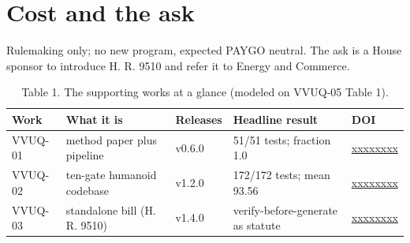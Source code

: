 \section{Cost and the ask}
\label{sec:e}

Rulemaking only; no new program, expected PAYGO neutral. The ask is a House sponsor to introduce H. R. 9510 and refer it to Energy and Commerce.

\begin{table}[H]
\centering
\footnotesize
\begin{tabularx}{\textwidth}{@{}L{1.55cm} Y L{1.4cm} Y L{1.55cm}@{}}
\toprule
\textbf{Work} & \textbf{What it is} & \textbf{Releases} & \textbf{Headline result} & \textbf{DOI}\\
\midrule
VVUQ-01 & method paper plus pipeline & v0.6.0 & 51/51 tests; fraction 1.0 & \href{https://doi.org/10.5281/zenodo.xxxxxxxx}{xxxxxxxx}\\
VVUQ-02 & ten-gate humanoid codebase & v1.2.0 & 172/172 tests; mean 93.56 & \href{https://doi.org/10.5281/zenodo.xxxxxxxx}{xxxxxxxx}\\
VVUQ-03 & standalone bill (H. R. 9510) & v1.4.0 & verify-before-generate as statute & \href{https://doi.org/10.5281/zenodo.xxxxxxxx}{xxxxxxxx}\\
\bottomrule
\end{tabularx}
\caption{Table 1. The supporting works at a glance (modeled on VVUQ-05 Table 1).}\label{tab:fourworks}
\end{table}
